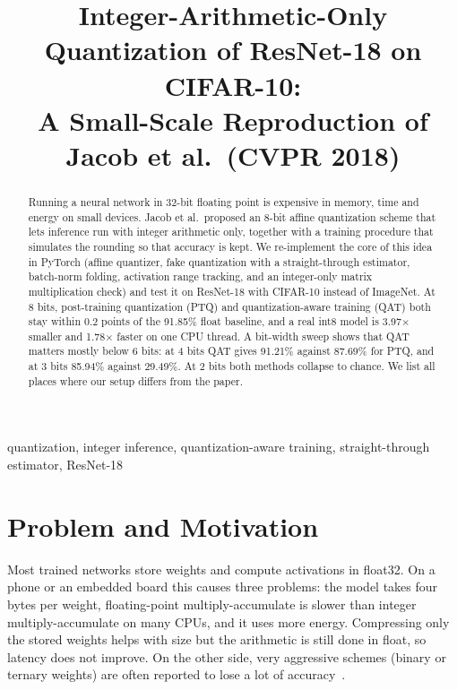 \documentclass[conference]{IEEEtran}
\begin{document}
\title{Integer-Arithmetic-Only Quantization of ResNet-18 on CIFAR-10:\\
A Small-Scale Reproduction of Jacob et al.\ (CVPR 2018)}

\author{
}%

\maketitle

\begin{abstract}
Running a neural network in 32-bit floating point is expensive in memory, time and energy on small devices. Jacob et al.\ proposed an 8-bit affine quantization scheme that lets inference run with integer arithmetic only, together with a training procedure that simulates the rounding so that accuracy is kept. We re-implement the core of this idea in PyTorch (affine quantizer, fake quantization with a straight-through estimator, batch-norm folding, activation range tracking, and an integer-only matrix multiplication check) and test it on ResNet-18 with CIFAR-10 instead of ImageNet. At 8 bits, post-training quantization (PTQ) and quantization-aware training (QAT) both stay within 0.2 points of the 91.85\% float baseline, and a real int8 model is 3.97$\times$ smaller and 1.78$\times$ faster on one CPU thread. A bit-width sweep shows that QAT matters mostly below 6 bits: at 4 bits QAT gives 91.21\% against 87.69\% for PTQ, and at 3 bits 85.94\% against 29.49\%. At 2 bits both methods collapse to chance. We list all places where our setup differs from the paper.
\end{abstract}

\begin{IEEEkeywords}
quantization, integer inference, quantization-aware training, straight-through estimator, ResNet-18
\end{IEEEkeywords}

\section{Problem and Motivation}
Most trained networks store weights and compute activations in float32. On a phone or an embedded board this causes three problems: the model takes four bytes per weight, floating-point multiply-accumulate is slower than integer multiply-accumulate on many CPUs, and it uses more energy. Compressing only the stored weights helps with size but the arithmetic is still done in float, so latency does not improve. On the other side, very aggressive schemes (binary or ternary weights) are often reported to lose a lot of accuracy~\cite{jacob2018}.
\end{document}
